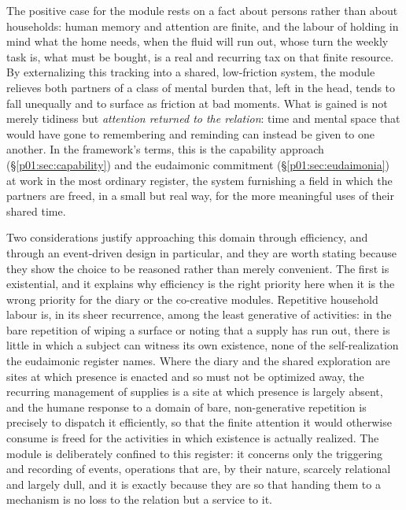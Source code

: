 \documentclass[11pt,a4paper]{article}
\begin{document}
The positive case for the module rests on a fact about persons rather than about households: human memory and attention are finite, and the labour of holding in mind what the home needs, when the fluid will run out, whose turn the weekly task is, what must be bought, is a real and recurring tax on that finite resource. By externalizing this tracking into a shared, low-friction system, the module relieves both partners of a class of mental burden that, left in the head, tends to fall unequally and to surface as friction at bad moments. What is gained is not merely tidiness but \emph{attention returned to the relation}: time and mental space that would have gone to remembering and reminding can instead be given to one another. In the framework's terms, this is the capability approach (§\ref{p01:sec:capability}) and the eudaimonic commitment (§\ref{p01:sec:eudaimonia}) at work in the most ordinary register, the system furnishing a field in which the partners are freed, in a small but real way, for the more meaningful uses of their shared time.

Two considerations justify approaching this domain through efficiency, and through an event-driven design in particular, and they are worth stating because they show the choice to be reasoned rather than merely convenient. The first is existential, and it explains why efficiency is the right priority here when it is the wrong priority for the diary or the co-creative modules. Repetitive household labour is, in its sheer recurrence, among the least generative of activities: in the bare repetition of wiping a surface or noting that a supply has run out, there is little in which a subject can witness its own existence, none of the self-realization the eudaimonic register names. Where the diary and the shared exploration are sites at which presence is enacted and so must not be optimized away, the recurring management of supplies is a site at which presence is largely absent, and the humane response to a domain of bare, non-generative repetition is precisely to dispatch it efficiently, so that the finite attention it would otherwise consume is freed for the activities in which existence is actually realized. The module is deliberately confined to this register: it concerns only the triggering and recording of events, operations that are, by their nature, scarcely relational and largely dull, and it is exactly because they are so that handing them to a mechanism is no loss to the relation but a service to it.
\end{document}
